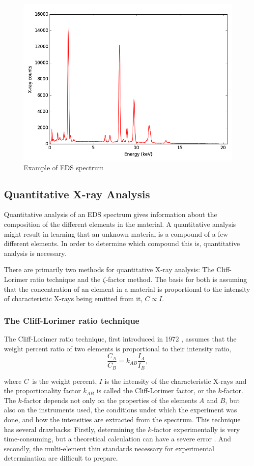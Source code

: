 \begin{figure}
\centering
\includegraphics[width=0.7\linewidth]{fig/edx-example-spectrum}
\caption{Example of EDS spectrum}
\label{fig:eds-example-spectrum}
\end{figure}

	\subsection{Quantitative X-ray Analysis}
Quantitative analysis of an EDS spectrum gives information about the composition of the different elements in the material. A quantitative analysis might result in learning that an unknown material is a compound of a few different elements. In order to determine which compound this is, quantitative analysis is necessary.

There are primarily two methods for quantitative X-ray analysis: The Cliff-Lorimer ratio technique and the $\zeta$-factor method. The basis for both is assuming that the concentration of an element in a material is proportional to the intensity of characteristic X-rays being emitted from it, $C \propto I$.

		\subsubsection{The Cliff-Lorimer ratio technique}
The Cliff-Lorimer ratio technique, first introduced in 1972 \cite{cliff-lorimer}, assumes that the weight percent ratio of two elements is proportional to their intensity ratio,
\begin{equation}
\frac{C_A}{C_B} = k_{AB}\frac{I_A}{I_B},
\end{equation}

where $C$ is the weight percent, $I$ is the intensity of the characteristic X-rays and the proportionality factor $k_{AB}$ is called the Cliff-Lorimer factor, or the $k$-factor. The $k$-factor depends not only on the properties of the elements $A$ and $B$, but also on the instruments used, the conditions under which the experiment was done, and how the intensities are extracted from the spectrum. This technique has several drawbacks: Firstly, determining the $k$-factor experimentally is very time-consuming, but a theoretical calculation can have a severe error \cite{williams-carter}. And secondly, the multi-element thin standards necessary for experimental determination are difficult to prepare.

